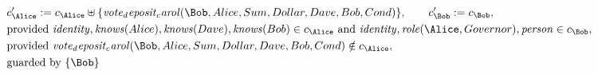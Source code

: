 \begin{align*}
&
c'_
{
\Alice
}
 := 
c_
{
\Alice
}
 \uplus 
\{
\mathit{
vote_deposit_carol
}
(
\Bob
,
Alice
,
Sum
,
Dollar
,
Dave
,
Bob
,
Cond
)
\}
, \qquad 
c'_
{
\Bob
}
 := 
c_
{
\Bob
}
,\\
&
\text{provided } 
\mathit{
identity
}
,
\mathit{
knows
}
(
Alice
)
,
\mathit{
knows
}
(
Dave
)
,
\mathit{
knows
}
(
Bob
)
 \in c_
{
\Alice
}
 \text{ and } 
\mathit{
identity
}
,
\mathit{
role
}
(
\Alice
,
Governor
)
,
\mathit{
person
}
 \in c_
{
\Bob
}
,\\
&
\text{provided } 
\mathit{
vote_deposit_carol
}
(
\Bob
,
Alice
,
Sum
,
Dollar
,
Dave
,
Bob
,
Cond
)
 \notin c_
{
\Alice
}
,\\
&
\text{guarded by } \{
\Bob
\}
\end{align*}

